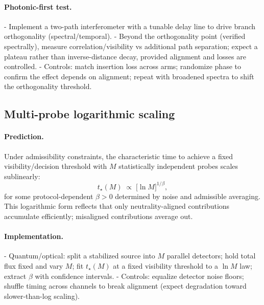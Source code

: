 \documentclass[12pt,a4paper]{article}
\begin{document}
\paragraph{Photonic-first test.}
- Implement a two-path interferometer with a tunable delay line to drive branch orthogonality (spectral/temporal).
- Beyond the orthogonality point (verified spectrally), measure correlation/visibility vs additional path separation; expect a plateau rather than inverse-distance decay, provided alignment and losses are controlled.
- Controls: match insertion loss across arms; randomize phase to confirm the effect depends on alignment; repeat with broadened spectra to shift the orthogonality threshold.

\subsection{Multi-probe logarithmic scaling}
\paragraph{Prediction.}
Under admissibility constraints, the characteristic time to achieve a fixed visibility/decision threshold with $M$ statistically independent probes scales sublinearly:
\[
  t_{\star}(M) \;\propto\; \bigl[\ln M\bigr]^{1/\beta},
\]
for some protocol-dependent $\beta>0$ determined by noise and admissible averaging. This logarithmic form reflects that only neutrality-aligned contributions accumulate efficiently; misaligned contributions average out.

\paragraph{Implementation.}
- Quantum/optical: split a stabilized source into $M$ parallel detectors; hold total flux fixed and vary $M$; fit $t_{\star}(M)$ at a fixed visibility threshold to a $\ln M$ law; extract $\beta$ with confidence intervals.
- Controls: equalize detector noise floors; shuffle timing across channels to break alignment (expect degradation toward slower-than-log scaling).
\end{document}
